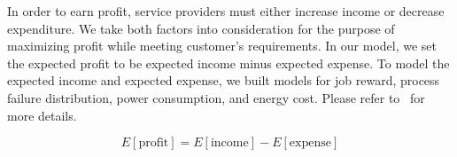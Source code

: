 In order to earn profit, service providers must either increase
income or decrease expenditure. We take both factors into
consideration for the purpose of maximizing profit while meeting
customer's requirements. In our model, we set the expected profit to be
expected income minus expected expense. To model the expected income and expected expense, we built models for job reward, process failure distribution, power consumption, and energy cost. Please refer to~\cite{cui_2014_closer} for more details.

\begin{equation}
E[\text{profit}]=E[\text{income}]-E[\text{expense}]
\end{equation}



%
%
%
%
%
%
